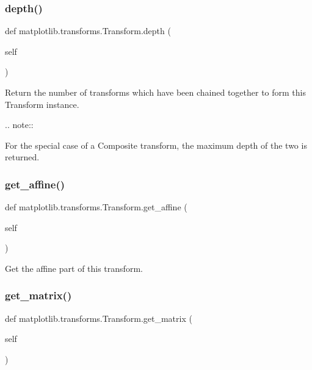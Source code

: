 \subsubsection{\texorpdfstring{depth()}{depth()}}
{\footnotesize\ttfamily def matplotlib.\+transforms.\+Transform.\+depth (\begin{DoxyParamCaption}\item[{}]{self }\end{DoxyParamCaption})}

\begin{DoxyVerb}Return the number of transforms which have been chained
together to form this Transform instance.

.. note::

    For the special case of a Composite transform, the maximum depth
    of the two is returned.\end{DoxyVerb}
 \mbox{\label{classmatplotlib_1_1transforms_1_1Transform_a590587b99bea670e821c6c65cf669c49}} 
\subsubsection{\texorpdfstring{get\+\_\+affine()}{get\_affine()}}
{\footnotesize\ttfamily def matplotlib.\+transforms.\+Transform.\+get\+\_\+affine (\begin{DoxyParamCaption}\item[{}]{self }\end{DoxyParamCaption})}

\begin{DoxyVerb}Get the affine part of this transform.\end{DoxyVerb}
 \mbox{\label{classmatplotlib_1_1transforms_1_1Transform_a88c05fdde2e3ccb870217439d4785dff}} 
\subsubsection{\texorpdfstring{get\+\_\+matrix()}{get\_matrix()}}
{\footnotesize\ttfamily def matplotlib.\+transforms.\+Transform.\+get\+\_\+matrix (\begin{DoxyParamCaption}\item[{}]{self }\end{DoxyParamCaption})}

